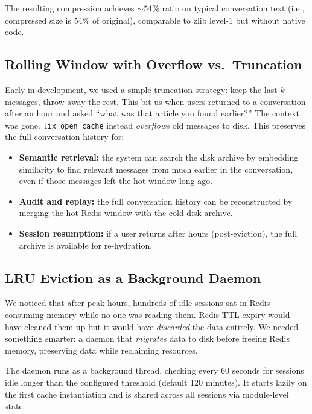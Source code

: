 \documentclass[conference]{IEEEtran}
\begin{document}
The resulting compression achieves ${\sim}54\%$ ratio on typical conversation text (i.e., compressed size is 54\% of original), comparable to zlib level-1 but without native code.

\subsection{Rolling Window with Overflow vs.\ Truncation}

Early in development, we used a simple truncation strategy: keep the last $k$ messages, throw away the rest. This bit us when users returned to a conversation after an hour and asked ``what was that article you found earlier?'' The context was gone. \texttt{lix\_open\_cache} instead \emph{overflows} old messages to disk. This preserves the full conversation history for:

\begin{itemize}
\item \textbf{Semantic retrieval:} the system can search the disk archive by embedding similarity to find relevant messages from much earlier in the conversation, even if those messages left the hot window long ago.
\item \textbf{Audit and replay:} the full conversation history can be reconstructed by merging the hot Redis window with the cold disk archive.
\item \textbf{Session resumption:} if a user returns after hours (post-eviction), the full archive is available for re-hydration.
\end{itemize}

\subsection{LRU Eviction as a Background Daemon}

We noticed that after peak hours, hundreds of idle sessions sat in Redis consuming memory while no one was reading them. Redis TTL expiry would have cleaned them up-but it would have \emph{discarded} the data entirely. We needed something smarter: a daemon that \emph{migrates} data to disk before freeing Redis memory, preserving data while reclaiming resources.

The daemon runs as a background thread, checking every 60 seconds for sessions idle longer than the configured threshold (default 120 minutes). It starts lazily on the first cache instantiation and is shared across all sessions via module-level state.
\end{document}
